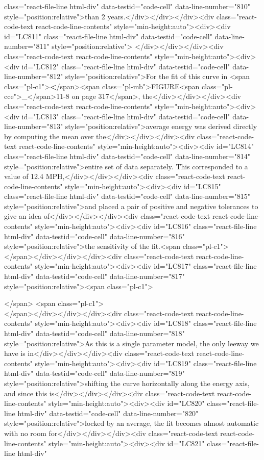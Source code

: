 {{{{{class="react-file-line html-div" data-testid="code-cell" data-line-number="810" style="position:relative">than 2 years.</div></div></div><div class="react-code-text react-code-line-contents" style="min-height:auto"><div><div id="LC811" class="react-file-line html-div" data-testid="code-cell" data-line-number="811" style="position:relative">
</div></div></div><div class="react-code-text react-code-line-contents" style="min-height:auto"><div><div id="LC812" class="react-file-line html-div" data-testid="code-cell" data-line-number="812" style="position:relative">For the fit of this curve in <span class="pl-c1">\textbf</span>{<span class="pl-mb">FIGURE<span class="pl-cce">\_</span>11-8 on page 317</span>}, the</div></div></div><div class="react-code-text react-code-line-contents" style="min-height:auto"><div><div id="LC813" class="react-file-line html-div" data-testid="code-cell" data-line-number="813" style="position:relative">average energy was derived directly by computing the mean over the</div></div></div><div class="react-code-text react-code-line-contents" style="min-height:auto"><div><div id="LC814" class="react-file-line html-div" data-testid="code-cell" data-line-number="814" style="position:relative">entire set of data separately. This corresponded to a value of 12.4 MPH,</div></div></div><div class="react-code-text react-code-line-contents" style="min-height:auto"><div><div id="LC815" class="react-file-line html-div" data-testid="code-cell" data-line-number="815" style="position:relative">and placed a pair of positive and negative tolerances to give an idea of</div></div></div><div class="react-code-text react-code-line-contents" style="min-height:auto"><div><div id="LC816" class="react-file-line html-div" data-testid="code-cell" data-line-number="816" style="position:relative">the sensitivity of the fit.<span class="pl-c1">\\</span></div></div></div><div class="react-code-text react-code-line-contents" style="min-height:auto"><div><div id="LC817" class="react-file-line html-div" data-testid="code-cell" data-line-number="817" style="position:relative"><span class="pl-c1">\strut</span> <span class="pl-c1">\\</span></div></div></div><div class="react-code-text react-code-line-contents" style="min-height:auto"><div><div id="LC818" class="react-file-line html-div" data-testid="code-cell" data-line-number="818" style="position:relative">As this is a single parameter model, the only leeway we have is in</div></div></div><div class="react-code-text react-code-line-contents" style="min-height:auto"><div><div id="LC819" class="react-file-line html-div" data-testid="code-cell" data-line-number="819" style="position:relative">shifting the curve horizontally along the energy axis, and since this is</div></div></div><div class="react-code-text react-code-line-contents" style="min-height:auto"><div><div id="LC820" class="react-file-line html-div" data-testid="code-cell" data-line-number="820" style="position:relative">locked by an average, the fit becomes almost automatic with no room for</div></div></div><div class="react-code-text react-code-line-contents" style="min-height:auto"><div><div id="LC821" class="react-file-line html-div" }}}}}
